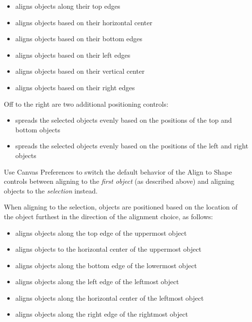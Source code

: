 \documentclass[../main.tex]{subfiles}
\begin{document}
\begin{itemize}
  \item {} aligns objects along their top edges
  \item {} aligns objects based on their
    horizontal center
  \item {} aligns objects based on their bottom
    edges
  \item {} aligns objects based on their left edges
  \item {} aligns objects based on their vertical
    center
  \item {} aligns objects based on their right
    edges
\end{itemize}

Off to the right are two additional positioning controls:

\begin{itemize}
  \item {} spreads the selected objects evenly based
    on the positions of the top and bottom objects
  \item {} spreads the selected objects evenly based
    on the positions of the left and right objects
\end{itemize}

\begin{ognote}
  Use Canvas Preferences to switch the default behavior of the Align to Shape controls between
  aligning to the \textit{first object} (as described above) and aligning objects to the
  \textit{selection} instead.

  When aligning to the selection, objects are positioned based on the location of the object
  furthest in the direction of the alignment choice, as follows:

  \begin{itemize}
    \item {} aligns objects along the top edge of the
      uppermost object
    \item {} aligns objects to the horizontal
      center of the uppermost object
    \item {} aligns objects along the bottom edge
      of the lowermost object
    \item {} aligns objects along the left edge of
      the leftmost object
    \item {} aligns objects along the horizontal
      center of the leftmost object
    \item {} aligns objects along the right edge of
      the rightmost object
  \end{itemize}
\end{ognote}
\end{document}
